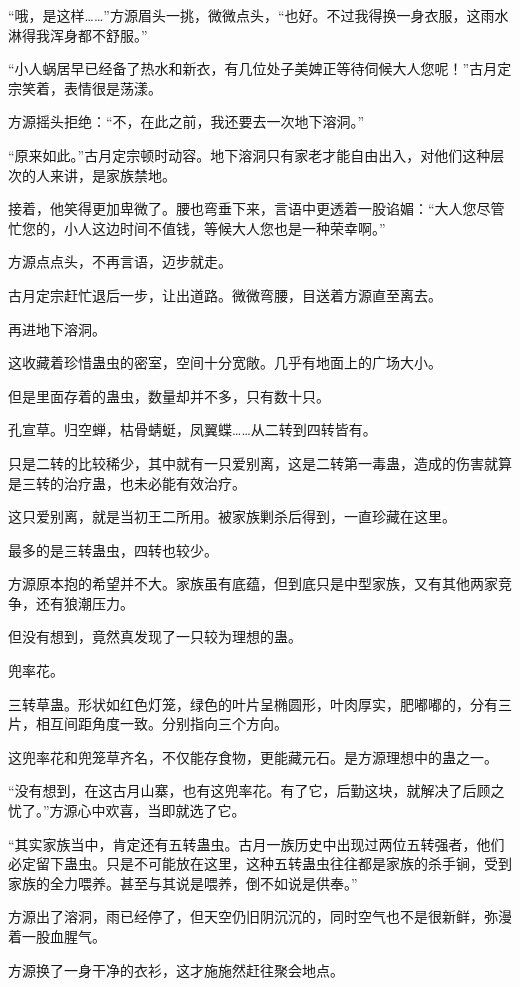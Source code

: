 \begin{this_body}
“哦，是这样……”方源眉头一挑，微微点头，“也好。不过我得换一身衣服，这雨水淋得我浑身都不舒服。”

“小人蜗居早已经备了热水和新衣，有几位处子美婢正等待伺候大人您呢！”古月定宗笑着，表情很是荡漾。

方源摇头拒绝：“不，在此之前，我还要去一次地下溶洞。”

“原来如此。”古月定宗顿时动容。地下溶洞只有家老才能自由出入，对他们这种层次的人来讲，是家族禁地。

接着，他笑得更加卑微了。腰也弯垂下来，言语中更透着一股谄媚：“大人您尽管忙您的，小人这边时间不值钱，等候大人您也是一种荣幸啊。”

方源点点头，不再言语，迈步就走。

古月定宗赶忙退后一步，让出道路。微微弯腰，目送着方源直至离去。

再进地下溶洞。

这收藏着珍惜蛊虫的密室，空间十分宽敞。几乎有地面上的广场大小。

但是里面存着的蛊虫，数量却并不多，只有数十只。

孔宣草。归空蝉，枯骨蜻蜓，凤翼蝶……从二转到四转皆有。

只是二转的比较稀少，其中就有一只爱别离，这是二转第一毒蛊，造成的伤害就算是三转的治疗蛊，也未必能有效治疗。

这只爱别离，就是当初王二所用。被家族剿杀后得到，一直珍藏在这里。

最多的是三转蛊虫，四转也较少。

方源原本抱的希望并不大。家族虽有底蕴，但到底只是中型家族，又有其他两家竞争，还有狼潮压力。

但没有想到，竟然真发现了一只较为理想的蛊。

兜率花。

三转草蛊。形状如红色灯笼，绿色的叶片呈椭圆形，叶肉厚实，肥嘟嘟的，分有三片，相互间距角度一致。分别指向三个方向。

这兜率花和兜笼草齐名，不仅能存食物，更能藏元石。是方源理想中的蛊之一。

“没有想到，在这古月山寨，也有这兜率花。有了它，后勤这块，就解决了后顾之忧了。”方源心中欢喜，当即就选了它。

“其实家族当中，肯定还有五转蛊虫。古月一族历史中出现过两位五转强者，他们必定留下蛊虫。只是不可能放在这里，这种五转蛊虫往往都是家族的杀手锏，受到家族的全力喂养。甚至与其说是喂养，倒不如说是供奉。”

方源出了溶洞，雨已经停了，但天空仍旧阴沉沉的，同时空气也不是很新鲜，弥漫着一股血腥气。

方源换了一身干净的衣衫，这才施施然赶往聚会地点。


\end{this_body}

